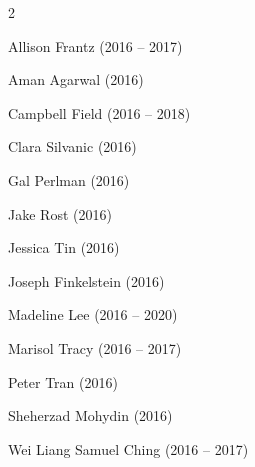 \documentclass[11pt, a4paper]{article} %
\newcommand{\years}[1]{\marginnote{\footnotesize #1}} %
\begin{document}
\begin{multicols}{2}
\begin{etaremune}
  \item Allison Frantz (2016 -- 2017)
  \item Aman Agarwal (2016)
  \item Campbell Field (2016 -- 2018)
  \item Clara Silvanic (2016)
  \item Gal Perlman (2016)
  \item Jake Rost (2016)
  \item Jessica Tin (2016)
  \item Joseph Finkelstein (2016)
  \item Madeline Lee (2016 -- 2020)
  \item Marisol Tracy (2016 -- 2017)
  \item Peter Tran (2016)
  \item Sheherzad Mohydin (2016)
  \item Wei Liang Samuel Ching (2016 -- 2017)\end{etaremune}
\end{multicols}




\end{document}
